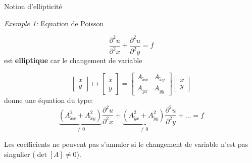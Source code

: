 \documentclass[
mode=present,    %
paper=a4paper,   %
orient=landscape,
display=slides,   %
size=10pt,
style=romain   %
]{powerdot}
\begin{document}
\begin{slide}[toc=Equ. Poisson]{Notion d'ellipticité}

\emph{Exemple 1:} Equation de Poisson

\begin{equation*}
\frac{\partial^2 u}{\partial^2 x} + \frac{\partial^2 u}{\partial^2 y} =  f
\end{equation*}
est \textbf{elliptique} car le changement de variable

\begin{equation*}
     \begin{bmatrix}
        x \\
        y
    \end{bmatrix}
    \mapsto
    \begin{bmatrix}
        \tilde{x} \\
        \tilde{y}
    \end{bmatrix}
    =
    \begin{bmatrix}
        A_{\tilde{x}x} & A_{\tilde{x}y} \\
        A_{\tilde{y}x} & A_{\tilde{y}y}
    \end{bmatrix}
    \begin{bmatrix}
        x \\
        y
    \end{bmatrix}
\end{equation*}
donne une équation du type:
\begin{equation*}
\underbrace{(A_{\tilde{x}x}^2 + A_{\tilde{x}y}^2)}_{\neq 0}
\frac{\partial^2 u}{\partial^2 x} +
\underbrace{(A_{\tilde{y}x}^2 + A_{\tilde{y}y}^2)}_{\neq 0}
\frac{\partial^2 u}{\partial^2 y} + ... =  f
\end{equation*}

Les coefficients ne peuvent pas s'annuler si le changement de variable n'est pas singulier ($\det [A]\neq 0$).

\end{slide}
\end{document}
